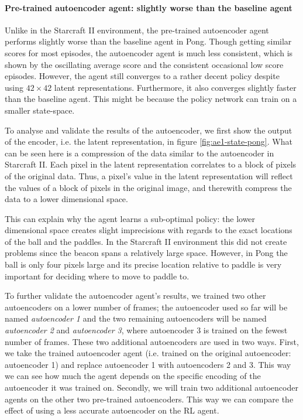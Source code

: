 \paragraph{Pre-trained autoencoder agent: slightly worse than the baseline agent}
Unlike in the Starcraft II environment, the pre-trained autoencoder agent performs slightly worse than the baseline agent in Pong. Though getting similar scores for most episodes, the autoencoder agent is much less consistent, which is shown by the oscillating average score and the consistent occasional low score episodes. However, the agent still converges to a rather decent policy despite using $42 \times 42$ latent representations. Furthermore, it also converges slightly faster than the baseline agent. This might be because the policy network can train on a smaller state-space.

To analyse and validate the results of the autoencoder, we first show the output of the encoder, i.e. the latent representation, in figure \ref{fig:ae1-state-pong}. What can be seen here is a compression of the data similar to the autoencoder in Starcraft II. Each pixel in the latent representation correlates to a block of pixels of the original data. Thus, a pixel's value in the latent representation will reflect the values of a block of pixels in the original image, and therewith compress the data to a lower dimensional space. 

This can explain why the agent learns a sub-optimal policy: the lower dimensional space creates slight imprecisions with regards to the exact locations of the ball and the paddles. In the Starcraft II environment this did not create problems since the beacon spans a relatively large space. However, in Pong the ball is only four pixels large and its precise location relative to paddle is very important for deciding where to move to paddle to.

To further validate the autoencoder agent's results, we trained two other autoencoders on a lower number of frames; the autoencoder used so far will be named \emph{autoencoder 1} and the two remaining autoencoders will be named \emph{autoencoder 2} and \emph{autoencoder 3}, where autoencoder 3 is trained on the fewest number of frames. These two additional autoencoders are used in two ways. First, we take the trained autoencoder agent (i.e. trained on the original autoencoder: autoencoder 1) and replace autoencoder 1 with autoencoders 2 and 3. This way we can see how much the agent depends on the specific encoding of the autoencoder it was trained on. Secondly, we will train two additional autoencoder agents on the other two pre-trained autoencoders. This way we can compare the effect of using a less accurate autoencoder on the RL agent.

